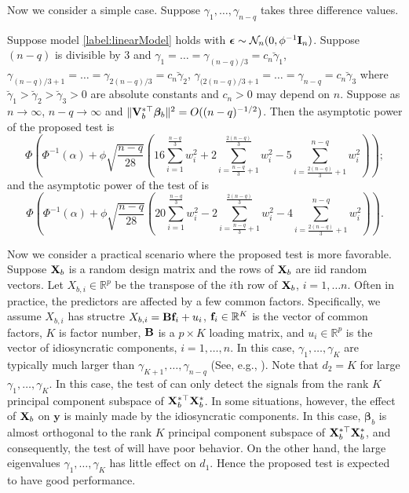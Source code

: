 \documentclass[smallextended]{svjour3}       %
\newcommand{\By}{\mathbf{y}}    \newcommand{\Bz}{\mathbf{z}}
\newcommand{\bfsym}[1]{\ensuremath{\boldsymbol{#1}}}
\def\bbeta{\bfsym \beta}
\begin{document}
Now we consider a simple case.
Suppose $\gamma_1,\dots,\gamma_{n-q}$ takes three difference values.
\begin{proposition}
    Suppose model \eqref{label:linearModel} holds with $\bepsilon\sim \mathcal N_n (0,\phi^{-1} \BI_n)$.
    Suppose $(n-q)$ is divisible by $3$ and $\gamma_1 = \dots=\gamma_{(n-q)/3}=c_n \breve{\gamma}_1$, $\gamma_{(n-q)/3 + 1} = \dots= \gamma_{2(n-q)/3} = c_n \breve{\gamma}_2$, $\gamma_{(2(n-q)/3 + 1} = \dots = \gamma_{n-q} = c_n \breve{\gamma}_3$ where $\breve \gamma_1 > \breve \gamma_2 > \breve \gamma_3 > 0$ are absolute constants and $c_n>0$ may depend on $n$.
        Suppose as $n\to \infty$, $n-q\to \infty$ and $ \| \BV_b^{*\top} \bbeta_b \|^2 = O((n-q)^{-1/2}) $.
        Then the asymptotic power of the proposed test is
        \begin{equation*}
            \Phi \left(
                \Phi^{-1}(\alpha) + 
                \phi \sqrt{\frac{n-q}{28}}\left(16\sum_{i=1}^{\frac{n-q}{3}} w_i^2  + 2 \sum_{i=\frac{n-q}{3}+1}^{\frac{2(n-q)}{3}} w_i^2 - 5 \sum_{i=\frac{2(n-q)}{3}+1}^{n-q} w_i^2 \right) 
            \right)
            ;
        \end{equation*}
    \label{prop:addedInRevision}
        and the asymptotic power of the test of  \cite{Goeman2006} is
        \begin{equation*}
            \Phi \left(
                \Phi^{-1}(\alpha) + 
                \phi \sqrt{\frac{n-q}{28}}\left(20\sum_{i=1}^{\frac{n-q}{3}} w_i^2 -2 \sum_{i=\frac{n-q}{3}+1}^{\frac{2(n-q)}{3}} w_i^2 - 4 \sum_{i=\frac{2(n-q)}{3}+1}^{n-q} w_i^2 \right) 
            \right)
            .
        \end{equation*}
\end{proposition}


Now we consider a practical scenario where the proposed test is more favorable.
Suppose $\mathbf{X}_b$ is a random design matrix and the rows of $\mathbf{X}_b$ are iid random vectors.
Let $X_{b,i}\in \mathbb R^p$ be the transpose of the $i$th row of $\mathbf{X}_b$, $i=1,\ldots n$.
Often in practice, the predictors are affected by a few common factors.
Specifically, we assume $X_{b,i}$ has structre $X_{b,i}= \mathbf{B} \mathbf{f}_i + u_i$, $\mathbf{f}_i \in \mathbb R^K$ is the vector of common factors, $K$ is factor number, $\mathbf{B}$ is a $p\times K$ loading matrix, and $u_i\in \mathbb R^p$ is the vector of idiosyncratic components, $i=1,\ldots,n $.
In this case, $\gamma_1,\ldots, \gamma_K$ are typically much larger than $\gamma_{K+1},\ldots, \gamma_{n-q}$ (See, e.g., \cite{Fan2013Large}).
Note that $d_2=K$ for large $\gamma_1,\ldots, \gamma_K$.
In this case, the test of \cite{Goeman2006} can only detect the signals from the rank $K$ principal component subspace of $\mathbf{X}_b^{*\top} \mathbf{X}_b^*$.
In some situations, however, the effect of $\mathbf{X}_b$ on $\By$ is mainly made by the idiosyncratic components.
In this case, $\bbeta_b$ is almost orthogonal to the rank $K$ principal component subspace of $\mathbf{X}_b^{*\top} \mathbf{X}_b^*$, and consequently, the test of \cite{Goeman2006} will have poor behavior.
On the other hand, the large eigenvalues $\gamma_1,\ldots, \gamma_K$ has little effect on $d_1$.
Hence the proposed test is expected to have good performance.
\end{document}
